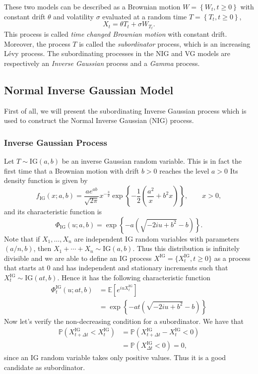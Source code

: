 These two models can be described as a Brownian motion $W=\left\{W_t,t\geq0\right\}$ with constant drift $\theta$ and volatility $\sigma$ evaluated at a random time $T=\left\{T_t,t\geq0\right\}$,
$$X_t = \theta T_t + \sigma W_{T_t}.$$
This process is called \textit{time changed Brownian motion} with constant drift. Moreover, the process $T$ is called the \textit{subordinator} process, which is an increasing L\'evy process. The subordinating processes in the NIG and VG models are respectively an \textit{Inverse Gaussian} process and a \textit{Gamma} process.

\subsection{Normal Inverse Gaussian Model}
First of all, we will present the subordinating Inverse Gaussian process which is used to construct the Normal Inverse Gaussian (NIG) process.

\subsubsection*{Inverse Gaussian Process}
Let $T \sim \text{IG}(a,b)$ be an inverse Gaussian random variable. This is in fact the first time that a Brownian motion with drift $b>0$ reaches the level $a>0$
Its density function is given by
$$ f_\text{IG} (x;a,b) = \frac{a e^{ab}}{\sqrt{2\pi}}x^{-\frac{3}{2}}\exp\left\{-\frac{1}{2}\left(\frac{a^2}{x}+b^2x\right)\right\},\qquad x>0,$$
and its characteristic function is
$$\Phi_\text{IG}(u;a,b) = \exp\left\{-a\left(\sqrt{-2iu+b^2}-b\right)\right\}.$$
Note that if $X_1,\ldots,X_n$ are independent IG random variables with parameters $(a/n,b)$, then $X_1+\cdots+X_n \sim \text{IG}(a,b)$. Thus this distribution is infinitely divisible and we are able to define an IG process $X^\text{IG}=\{X^\text{IG}_t,t\geq0\}$ as a process that starts at $0$ and has independent and stationary increments such that $X_t^\text{IG}\sim\text{IG}(at,b)$. Hence it has the following characteristic function
\begin{align*}
\Phi_t^\text{IG}(u;at,b) &= \mathbb{E}\left[e^{iuX_t^\text{IG}}\right]\\
&=\exp\left\{-at\left(\sqrt{-2iu+b^2}-b\right)\right\}
\end{align*}
Now let's verify the non-decreasing condition for a subordinator. We have that
\begin{align*}
\mathbb{P}\left(X^\text{IG}_{t+\Delta t} < X^\text{IG}_t\right) &= \mathbb{P}\left(X^\text{IG}_{t+\Delta t}-X^\text{IG}_t < 0\right)\\
&=\mathbb{P}\left(X^\text{IG}_{\Delta t}<0\right) = 0,
\end{align*}
since an IG random variable takes only positive values. Thus it is a good candidate as subordinator.

